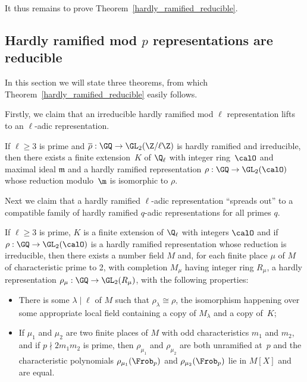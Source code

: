 It thus remains to prove Theorem~\ref{hardly_ramified_reducible}.

\subsection{Hardly ramified mod $p$ representations are reducible}

In this section we will state three theorems, from which Theorem~\ref{hardly_ramified_reducible}
easily follows.

Firstly, we claim that
an irreducible hardly ramified mod $\ell$ representation lifts to an $\ell$-adic representation.

\begin{theorem}
  \label{hardly-ramified-lifts}
  If $\ell\geq3$ is prime and $\overline{\rho}:\GQ\to\GL_2(\Z/\ell\Z)$
  is hardly ramified and irreducible, then there exists a finite extension~$K$ of $\Q_\ell$
  with integer ring~$\calO$ and maximal ideal $\mathfrak{m}$
  and a hardly ramified representation
  $\rho:\GQ\to\GL_2(\calO)$ whose reduction modulo~$\m$ is isomorphic to $\rho$.
\end{theorem}

Next we claim that a hardly ramified $\ell$-adic representation ``spreads out'' to a compatible
family of hardly ramified $q$-adic representations for all primes $q$.

\begin{theorem}
  \label{hardly-ramified-spreads-out}
  If $\ell\geq3$ is prime, $K$ is a finite extension of $\Q_\ell$
  with integers $\calO$ and if $\rho:\GQ\to\GL_2(\calO)$ is a hardly ramified representation
  whose reduction is irreducible,
  then there exists a number field $M$ and, for each finite place $\mu$ of $M$
  of characteristic prime to 2, with completion $M_\mu$ having integer ring $R_\mu$,
  a hardly representation $\rho_\mu:\GQ\to\GL_2(R_\mu)$, with the following properties:
  \begin{itemize}
    \item There is some $\lambda\mid\ell$ of $M$ such that $\rho_\lambda\cong\rho$,
      the isomorphism happening over some appropriate local field containing a copy
      of $M_\lambda$ and a copy of~$K$;
    \item If $\mu_1$ and $\mu_2$ are two finite places of $M$ with odd characteristics $m_1$
      and $m_2$, and if $p\nmid 2m_1m_2$ is prime, then $\rho_{\mu_1}$ and $\rho_{\mu_2}$
      are both unramified at~$p$ and the characteristic polynomials $\rho_{\mu_1}(\Frob_p)$
      and $\rho_{\mu_2}(\Frob_p)$ lie in $M[X]$ and are equal.
  \end{itemize}
\end{theorem}

